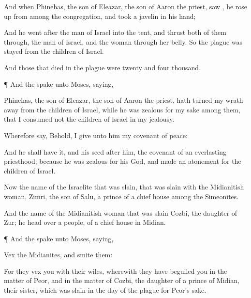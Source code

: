 {And when
Phinehas, the
son of
Eleazar, the
son of
Aaron the
priest,
saw
{}, he rose
up from
among the
congregation, and
took a
javelin in his
hand;

And he
went
after the
man of
Israel into the
tent, and
thrust
both of them through, the
man of
Israel, and the
woman
through her
belly. So the
plague was
stayed from the
children of
Israel.

And those that
died in the
plague were
twenty and
four
thousand.


\par }{\PP {}¶ And the
{}
spake unto
Moses,
saying,

Phinehas, the
son of
Eleazar, the
son of
Aaron the
priest, hath
turned my
wrath
away from the
children of
Israel, while he was
zealous for my
sake
among them, that I
consumed not the
children of
Israel in my
jealousy.

Wherefore
say, Behold, I
give unto him my
covenant of
peace:

And he shall have it, and his
seed
after him,
{} the
covenant of an
everlasting
priesthood;
because he was
zealous for his
God, and made an
atonement for the
children of
Israel.

Now the
name of the
Israelite that was
slain,
{} that was
slain with the Midianitish
woman,
{}
Zimri, the
son of
Salu, a
prince of a
chief
house among the
Simeonites.

And the
name of the
Midianitish
woman that was
slain
{}
Cozbi, the
daughter of
Zur; he
{}
head over a
people,
{} of a
chief
house in
Midian.


\par }{\PP {}¶ And the
{}
spake unto
Moses,
saying,

Vex the
Midianites, and
smite them:

For they
vex you with their
wiles, wherewith they have
beguiled you in the
matter of
Peor, and in the
matter of
Cozbi, the
daughter of a
prince of
Midian, their
sister, which was
slain in the
day of the
plague for
Peor’s
sake.




\par }
